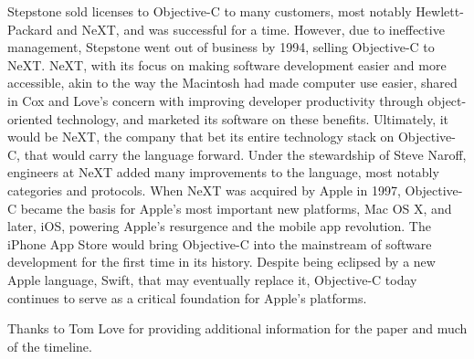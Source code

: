 \documentclass[acmsmall]{acmart}\settopmatter{}
\begin{document}
Stepstone sold licenses to Objective-C to many customers, most notably Hewlett-Packard and NeXT, and was successful for a time. However, due to ineffective management, Stepstone went out of business by 1994, selling Objective-C to NeXT. NeXT, with its focus on making software development easier and more accessible, akin to the way the Macintosh had made computer use easier, shared in Cox and Love's concern with improving developer productivity through object-oriented technology, and marketed its software on these benefits. Ultimately, it would be NeXT, the company that bet its entire technology stack on Objective-C, that would carry the language forward. Under the stewardship of Steve Naroff, engineers at NeXT added many improvements to the language, most notably categories and protocols. When NeXT was acquired by Apple in 1997, Objective-C became the basis for Apple's most important new platforms, Mac OS X, and later, iOS, powering Apple's resurgence and the mobile app revolution. The iPhone App Store would bring Objective-C into the mainstream of software development for the first time in its history. Despite being eclipsed by a new Apple language, Swift, that may eventually replace it, Objective-C today continues to serve as a critical foundation for Apple's platforms.

\begin{acks}                            %
Thanks to Tom Love for providing additional information for the paper and much of the timeline.
\end{acks}

\appendix
\end{document}
